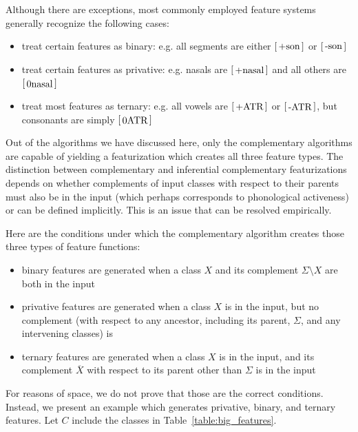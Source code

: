 \documentclass[12pt, oneside]{article}   	%
\newcommand{\featmat}[1]
{$\begin{bsmallmatrix*}[l]\text{\normalsize #1}\end{bsmallmatrix*}$}
\begin{document}
Although there are exceptions, most commonly employed feature systems generally recognize the following cases: \begin{itemize}
    \item treat certain features as binary: e.g. all segments are either \featmat{+son} or \featmat{-son}
    \item treat certain features as privative: e.g. nasals are \featmat{+nasal} and all others are \featmat{0nasal}
    \item treat most features as ternary: e.g. all vowels are \featmat{+ATR} or \featmat{-ATR}, but consonants are simply \featmat{0ATR}
    \end{itemize}
Out of the algorithms we have discussed here, only the complementary algorithms are capable of yielding a featurization which creates all three feature types. The distinction between complementary and inferential complementary featurizations depends on whether complements of input classes with respect to their parents must also be in the input (which perhaps corresponds to phonological activeness) or can be defined implicitly. This is an issue that can be resolved empirically.

Here are the conditions under which the complementary algorithm creates those three types of feature functions:
\begin{itemize}
    \item binary features are generated when a class $X$ and its complement $\Sigma \setminus X$ are both in the input
    \item privative features are generated when a class $X$ is in the input, but no complement (with respect to any ancestor, including its parent, $\Sigma$, and any intervening classes) is
    \item ternary features are generated when a class $X$ is in the input, and its complement $\overline{X}$ with respect to its parent other than $\Sigma$ is in the input
\end{itemize}

For reasons of space, we do not prove that those are the correct conditions. Instead, we present an example which generates privative, binary, and ternary features. Let $C$ include the classes in Table~\ref{table:big_features}.
\end{document}
